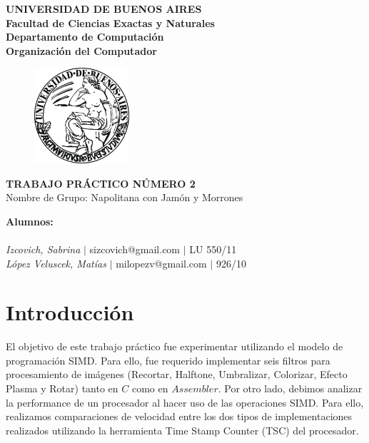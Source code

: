 \documentclass[10pt, a4paper]{article}
\begin{document}
\thispagestyle{empty}
\begin{center}

\Huge{ \bf{UNIVERSIDAD DE BUENOS AIRES}}
\\
\LARGE{\bf{Facultad de Ciencias Exactas y Naturales}}
\\
\textbf{Departamento de Computaci\'on}
\\
\textbf{Organizaci\'on del Computador}
\vspace{2.0\baselineskip}
\end{center}


\begin{figure}[h] %
\begin{center}
\includegraphics[width=100pt]{./image.jpeg}
\end{center}
\end{figure}
\begin{center}
\vspace*{0.7cm}

\huge{\bf TRABAJO PR\'ACTICO N\'UMERO 2}\\
\huge{Nombre de Grupo: Napolitana con Jam\'on y Morrones}
\vspace*{8cm}

\end{center}

\huge{\textbf{Alumnos:}}\\
\\
\vspace*{0.3cm}
\Large{\textsl{Izcovich, Sabrina} $|$ sizcovich@gmail.com $|$ LU 550/11}\\
\vspace*{0.3cm}
\Large{\textsl{L\'opez Veluscek, Matías} \hspace{0.1cm}$|$ milopezv@gmail.com $|$ 926/10}\\
\vspace*{0.3cm}
\vspace{0.5cm}
 
\newpage
\thispagestyle{empty}
\tableofcontents
\newpage
\section{Introducci\'on}
El objetivo de este trabajo pr\'actico fue experimentar utilizando el modelo de programaci\'on SIMD. Para ello, fue requerido implementar seis filtros para procesamiento de im\'agenes (Recortar, Halftone, Umbralizar, Colorizar, Efecto Plasma y Rotar) tanto en $C$ como en $Assembler$.\newline
Por otro lado, debimos analizar la performance de un procesador al hacer uso de las operaciones SIMD. Para ello, realizamos comparaciones de velocidad entre los dos tipos de implementaciones realizados utilizando la herramienta Time Stamp Counter (TSC) del procesador.
\end{document}
